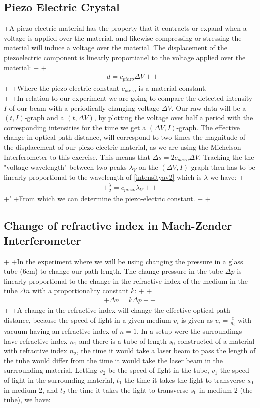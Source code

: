 \subsection{Piezo Electric Crystal}
+A piezo electric material has the property that it contracts or expand when a voltage is applied over the material, and likewise compressing or stressing the material will induce a voltage over the material. The displacement of the piezoelectric component is linearly proportianel to the voltage applied over the material:
+
+\begin{align}
+d = c_{piezo}\Delta V
+\label{piezodisp}
+\end{align}
+
+Where the piezo-electric constant $c_{piezo}$ is a material constant.\\
+
+In relation to our experiment we are going to compare the detected intensity $I$ of our beam with a periodically changing voltage $\Delta V$. Our raw data will be a $(t,I)$-graph and a $(t, \Delta V)$, by plotting the voltage over half a period with the corresponding intensities for the time we get a $(\Delta V,I)$-graph. The effective change in optical path distance, will correspond to two times the magnitude of the displacement of our piezo-electric material, as we are using the Michelson Interferometer to this exercise. This means that $\Delta s = 2 c_{piezo} \Delta V$. Tracking the the "voltage wavelength" between two peaks $\lambda_V$ on the $(\Delta V,I)$-graph then has to be linearly proportional to the wavelength of \ref{intensityav2} which is $\lambda$ we have:
+
+\begin{align}
+\frac{\lambda}{2} = c_{piezo}\lambda_V
+\label{piezo}
+\end{align}
+'
+From which we can determine the piezo-electric constant. 
+
+\subsection{Change of refractive index in Mach-Zender Interferometer}
+
+In the experiment where we will be using changing the pressure in a glass tube (6cm) to change our path length. The change pressure in the tube $\Delta p$ is linearly proportional to the change in the refractive index of the medium in the tube $\Delta n$ with a proportionality constant $k$:
+
+\begin{align}
+\Delta n = k \Delta p
+\label{pn}
+\end{align}
+
+A change in the refractive index will change the effective optical path distance, because the speed of light in a given medium $v_i$ is given as $v_i=\frac{c}{n_i}$ with vacuum having an refractive index of $n=1$. In a setup were the surroundings have refractive index $n_1$ and there is a tube of length $s_0$ constructed of a material with refractive index $n_2$, the time it would take a laser beam to pass the length of the tube would differ from the time it would take the laser beam in the surrrounding material. Letting $v_2$ be the speed of light in the tube, $v_1$ the speed of light in the surrounding material, $t_1$ the time it takes the light to transverse $s_0$ in medium 2, and $t_2$ the time it takes the light to transverse $s_0$ in medium 2 (the tube), we have:
